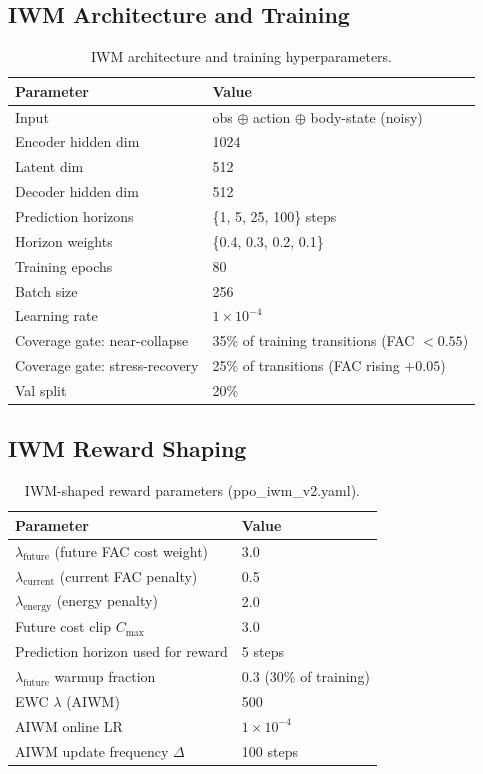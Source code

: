 \documentclass{article}
\begin{document}
{\vspace{-4pt}
\subsection*{IWM Architecture and Training}
\vspace{-4pt}
\begin{table}[H]
\centering
\caption{IWM architecture and training hyperparameters.}
\begin{tabular}{ll}
\toprule
Parameter & Value \\
\midrule
Input & obs $\oplus$ action $\oplus$ body-state (noisy) \\
Encoder hidden dim & 1024 \\
Latent dim & 512 \\
Decoder hidden dim & 512 \\
Prediction horizons & \{1, 5, 25, 100\} steps \\
Horizon weights & \{0.4, 0.3, 0.2, 0.1\} \\
Training epochs & 80 \\
Batch size & 256 \\
Learning rate & $1 \times 10^{-4}$ \\
Coverage gate: near-collapse & 35\% of training transitions (FAC $< 0.55$) \\
Coverage gate: stress-recovery & 25\% of transitions (FAC rising $+0.05$) \\
Val split & 20\% \\
\bottomrule
\end{tabular}
\end{table}

\vspace{-4pt}
\subsection*{IWM Reward Shaping}
\vspace{-4pt}
\begin{table}[H]
\centering
\caption{IWM-shaped reward parameters (ppo\_iwm\_v2.yaml).}
\begin{tabular}{ll}
\toprule
Parameter & Value \\
\midrule
$\lambda_\text{future}$ (future FAC cost weight) & 3.0 \\
$\lambda_\text{current}$ (current FAC penalty) & 0.5 \\
$\lambda_\text{energy}$ (energy penalty) & 2.0 \\
Future cost clip $C_{\max}$ & 3.0 \\
Prediction horizon used for reward & 5 steps \\
$\lambda_\text{future}$ warmup fraction & 0.3 (30\% of training) \\
EWC $\lambda$ (AIWM) & 500 \\
AIWM online LR & $1 \times 10^{-4}$ \\
AIWM update frequency $\Delta$ & 100 steps \\
\bottomrule
\end{tabular}
\end{table}

}
\end{document}
